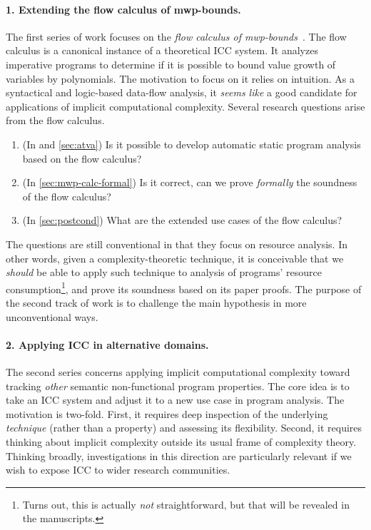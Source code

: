 \paragraph*{1. Extending the flow calculus of mwp-bounds.}
The first series of work focuses on the \emph{flow calculus of mwp-bounds}~\cite{jones2009}.
The flow calculus is a canonical instance of a theoretical ICC system.
It analyzes imperative programs to determine if it is possible to bound value growth of variables by polynomials.
The motivation to focus on it relies on intuition.
As a syntactical and logic-based data-flow analysis, it \emph{seems like} a good candidate for applications of implicit computational complexity.
Several research questions arise from the flow calculus.
\begin{enumerate}
\item (In  and \autoref{sec:atva}) Is it possible to develop automatic static program analysis based on the flow calculus?
\item (In \autoref{sec:mwp-calc-formal}) Is it correct, \ie can we prove \emph{formally} the soundness of the flow calculus?
\item (In \autoref{sec:postcond}) What are the extended use cases of the flow calculus?
\end{enumerate}

The questions are still conventional in that they focus on resource analysis.
In other words, given a complexity-theoretic technique, it is conceivable that we \emph{should} be able to apply
such technique to analysis of programs' resource consumption\footnote{
Turns out, this is actually \emph{not} straightforward, but that will be revealed in the manuscripts.},
and prove its soundness based on its paper proofs.
The purpose of the second track of work is to challenge the main hypothesis in more unconventional ways.

\paragraph*{2. Applying ICC in alternative domains.}
The second series concerns applying implicit computational complexity toward tracking \emph{other} semantic non-functional program properties.
The core idea is to take an ICC system and adjust it to a new use case in program analysis.
The motivation is two-fold.
First, it requires deep inspection of the underlying \emph{technique} (rather than a property) and assessing its flexibility.
Second, it requires thinking about implicit complexity outside its usual frame of complexity theory.
Thinking broadly, investigations in this direction are particularly relevant if we wish to expose ICC to wider research communities.

